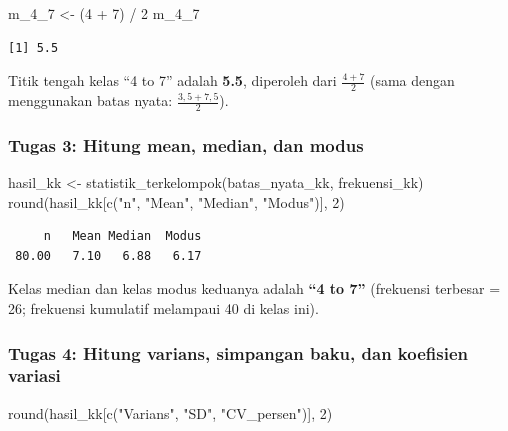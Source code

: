\documentclass[
  indonesian,
  letterpaper,
]{book}
\newenvironment{Shaded}{\begin{snugshade}}{\end{snugshade}}
\newcommand{\DecValTok}[1]{\textcolor[rgb]{0.68,0.00,0.00}{#1}}
\newcommand{\FunctionTok}[1]{\textcolor[rgb]{0.28,0.35,0.67}{#1}}
\newcommand{\NormalTok}[1]{\textcolor[rgb]{0.00,0.23,0.31}{#1}}
\newcommand{\OtherTok}[1]{\textcolor[rgb]{0.00,0.23,0.31}{#1}}
\newcommand{\SpecialCharTok}[1]{\textcolor[rgb]{0.37,0.37,0.37}{#1}}
\newcommand{\StringTok}[1]{\textcolor[rgb]{0.13,0.47,0.30}{#1}}
\begin{document}
\begin{Shaded}
\begin{Highlighting}[]
\NormalTok{m\_4\_7 }\OtherTok{\textless{}{-}}\NormalTok{ (}\DecValTok{4} \SpecialCharTok{+} \DecValTok{7}\NormalTok{) }\SpecialCharTok{/} \DecValTok{2}
\NormalTok{m\_4\_7}
\end{Highlighting}
\end{Shaded}

\begin{verbatim}
[1] 5.5
\end{verbatim}

Titik tengah kelas ``4 to 7'' adalah \textbf{5.5}, diperoleh dari
\(\frac{4+7}{2}\) (sama dengan menggunakan batas nyata:
\(\frac{3{,}5 + 7{,}5}{2}\)).

\subsubsection{Tugas 3: Hitung mean, median, dan
modus}\label{tugas-3-hitung-mean-median-dan-modus}

\begin{Shaded}
\begin{Highlighting}[]
\NormalTok{hasil\_kk }\OtherTok{\textless{}{-}} \FunctionTok{statistik\_terkelompok}\NormalTok{(batas\_nyata\_kk, frekuensi\_kk)}
\FunctionTok{round}\NormalTok{(hasil\_kk[}\FunctionTok{c}\NormalTok{(}\StringTok{"n"}\NormalTok{, }\StringTok{"Mean"}\NormalTok{, }\StringTok{"Median"}\NormalTok{, }\StringTok{"Modus"}\NormalTok{)], }\DecValTok{2}\NormalTok{)}
\end{Highlighting}
\end{Shaded}

\begin{verbatim}
     n   Mean Median  Modus 
 80.00   7.10   6.88   6.17 
\end{verbatim}

Kelas median dan kelas modus keduanya adalah \textbf{``4 to 7''}
(frekuensi terbesar = 26; frekuensi kumulatif melampaui 40 di kelas
ini).

\subsubsection{Tugas 4: Hitung varians, simpangan baku, dan koefisien
variasi}\label{tugas-4-hitung-varians-simpangan-baku-dan-koefisien-variasi}

\begin{Shaded}
\begin{Highlighting}[]
\FunctionTok{round}\NormalTok{(hasil\_kk[}\FunctionTok{c}\NormalTok{(}\StringTok{"Varians"}\NormalTok{, }\StringTok{"SD"}\NormalTok{, }\StringTok{"CV\_persen"}\NormalTok{)], }\DecValTok{2}\NormalTok{)}
\end{Highlighting}
\end{Shaded}
\end{document}

